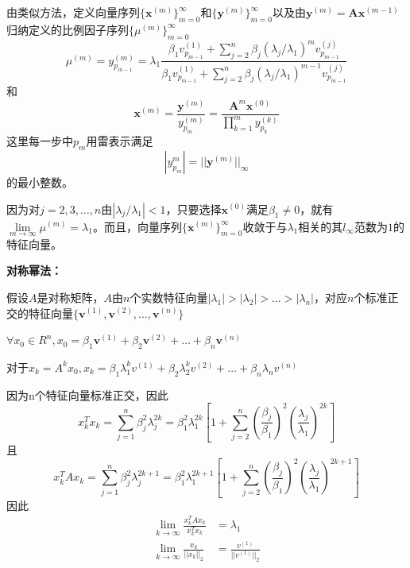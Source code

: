 \documentclass[12pt]{ctexart}
\begin{document}
	由类似方法，定义向量序列$\{\mathbf{x}^{(m)}\}_{m=0}^\infty$和$\{\mathbf{y}^{(m)}\}_{m=0}^\infty$以及由$\mathbf{y}^{(m)}=\mathbf{A}\mathbf{x}^{(m-1)}$归纳定义的比例因子序列$\{\mu^{(m)}\}_{m=0}^\infty$
	\begin{equation*}
	\mu^{(m)}=y_{p_{m-1}}^{(m)}=\lambda_1\frac{\beta_1v_{p_{m-1}}^{(1)}+\sum\limits_{j=2}^{n}\beta_j(\lambda_j/\lambda_1)^mv_{p_{m-1}}^{(j)}}{\beta_1v_{p_{m-1}}^{(1)}+\sum\limits_{j=2}^{n}\beta_j(\lambda_j/\lambda_1)^{m-1}v_{p_{m-1}}^{(j)}}
	\end{equation*}
	和
	\begin{equation*}
	\mathbf{x}^{(m)}=\frac{\mathbf{y}^{(m)}}{y_{p_m}^{(m)}}=\frac{\mathbf{A}^{m}\mathbf{x}^{(0)}}{\prod\limits_{k=1}^my_{p_k}^{(k)}}
	\end{equation*}
	这里每一步中$p_m$用雷表示满足
	\begin{equation*}
	|y_{p_m}^m|=||\mathbf{y}^{(m)}||_\infty
	\end{equation*}
	的最小整数。
	
	因为对$j=2,3,\dots,n$由$|\lambda_j/\lambda_1|<1$，只要选择$\mathbf{x}^{(0)}$满足$\beta_1\neq 0$，就有$\lim\limits_{m\rightarrow\infty}\mu^{(m)}=\lambda_1$。而且，向量序列$\{\mathbf{x}^{(m)}\}_{m=0}^\infty$收敛于与$\lambda_1$相关的其$l_\infty$范数为$1$的特征向量。
	
	\textbf{对称幂法：}
	
	假设$A$是对称矩阵，$A$由$n$个实数特征向量$|\lambda_1|>|\lambda_2|>\dots>|\lambda_n|$，对应$n$个标准正交的特征向量$\{\mathbf{v}^{(1)},\mathbf{v}^{(2)},\dots,\mathbf{v}^{(n)}\}$
	
	$\forall x_0\in R^n,x_0=\beta_1\mathbf{v}^{(1)}+\beta_2\mathbf{v}^{(2)}+\dots+\beta_n\mathbf{v}^{(n)}$
	
	对于$x_k=A^kx_0,x_k=\beta_1\lambda_1^kv^{(1)}+\beta_2\lambda_2^kv^{(2)}+\dots+\beta_n\lambda_nv^{(n)}$
	
	因为n个特征向量标准正交，因此
	\begin{equation*}
		x_k^Tx_k=\sum_{j=1}^{n}\beta_j^2\lambda_j^{2k}=\beta_1^2\lambda_1^{2k}[1+\sum_{j=2}^{n}\left(\frac{\beta_j}{\beta_1}\right)^2\left(\frac{\lambda_j}{\lambda_1}\right)^{2k}]
	\end{equation*}且
	\begin{equation*}
	x_k^TAx_k=\sum_{j=1}^{n}\beta_j^2\lambda_j^{2k+1}=\beta_1^2\lambda_1^{2k+1}[1+\sum_{j=2}^{n}\left(\frac{\beta_j}{\beta_1}\right)^2\left(\frac{\lambda_j}{\lambda_1}\right)^{2k+1}]
	\end{equation*}因此
	\begin{equation*}
	\begin{split}
	\lim\limits_{k\rightarrow\infty}\frac{x_k^TAx_k}{x_k^Tx_k}&=\lambda_1\\
	\lim\limits_{k\rightarrow\infty}\frac{x_k}{||x_k||_2}&=\frac{v^{(1)}}{||v^{(1)}||_2}
	\end{split}
	\end{equation*}
	
\end{document}
